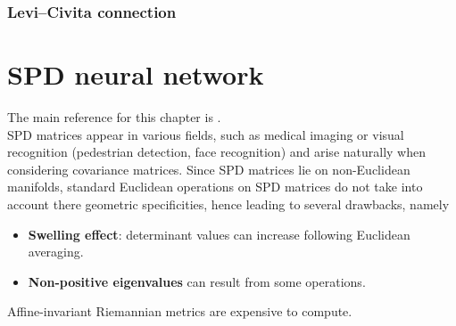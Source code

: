 \documentclass[10pt,a4paper]{book}
\theoremstyle{definition}
\theoremstyle{plain}
\theoremstyle{remark}
\begin{document}
\subsection{Levi--Civita connection}





\chapter{SPD neural network}
The main reference for this chapter is \cite{huang2017riemannian}. \\

SPD matrices appear in various fields, such as medical imaging or visual recognition (pedestrian detection, face recognition) and arise naturally when considering covariance matrices.
Since SPD matrices lie on non-Euclidean manifolds, standard Euclidean operations on SPD matrices do not take into account there geometric specificities, hence leading to several drawbacks, namely
\begin{itemize}
    \item \textbf{Swelling effect}: determinant values can increase following Euclidean averaging.
    \item \textbf{Non-positive eigenvalues} can result from some operations.
\end{itemize}
Affine-invariant Riemannian metrics are expensive to compute.
\end{document}
